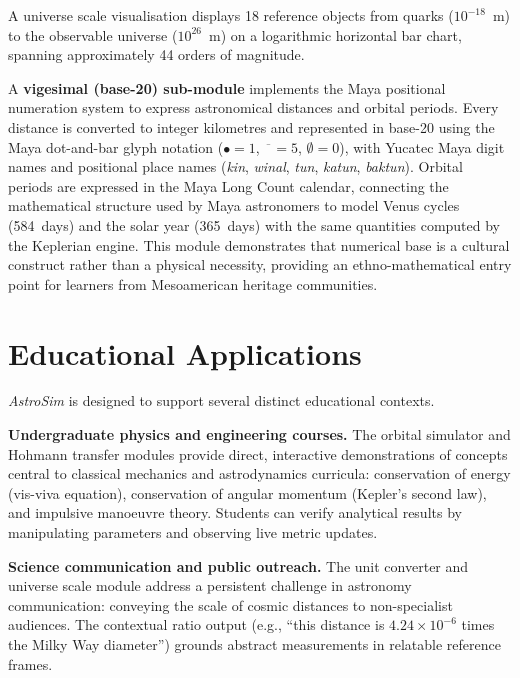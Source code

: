 \documentclass[10pt,a4paper]{article}
\begin{document}
A universe scale visualisation displays 18 reference objects from quarks
($10^{-18}$~m) to the observable universe ($10^{26}$~m) on a logarithmic
horizontal bar chart, spanning approximately 44 orders of magnitude.

A \textbf{vigesimal (base-20) sub-module} implements the Maya positional
numeration system \citep{ascher2002} to express astronomical distances and
orbital periods. Every distance is converted to integer kilometres and
represented in base-20 using the Maya dot-and-bar glyph notation
($\bullet = 1$, $\overline{\phantom{x}} = 5$, $\emptyset = 0$), with
Yucatec Maya digit names and positional place names (\textit{kin},
\textit{winal}, \textit{tun}, \textit{katun}, \textit{baktun}).
Orbital periods are expressed in the Maya Long Count calendar, connecting
the mathematical structure used by Maya astronomers to model Venus cycles
(584~days) and the solar year (365~days) with the same quantities computed
by the Keplerian engine. This module demonstrates that numerical base is a
cultural construct rather than a physical necessity, providing an
ethno-mathematical entry point for learners from Mesoamerican heritage
communities.

\section{Educational Applications}

\textit{AstroSim} is designed to support several distinct educational contexts.

\textbf{Undergraduate physics and engineering courses.}
The orbital simulator and Hohmann transfer modules provide direct, interactive
demonstrations of concepts central to classical mechanics and astrodynamics
curricula: conservation of energy (vis-viva equation), conservation of angular
momentum (Kepler's second law), and impulsive manoeuvre theory.
Students can verify analytical results by manipulating parameters and observing
live metric updates.

\textbf{Science communication and public outreach.}
The unit converter and universe scale module address a persistent challenge in
astronomy communication: conveying the scale of cosmic distances to non-specialist
audiences.
The contextual ratio output (e.g., ``this distance is $4.24 \times 10^{-6}$
times the Milky Way diameter'') grounds abstract measurements in relatable
reference frames.
\end{document}
